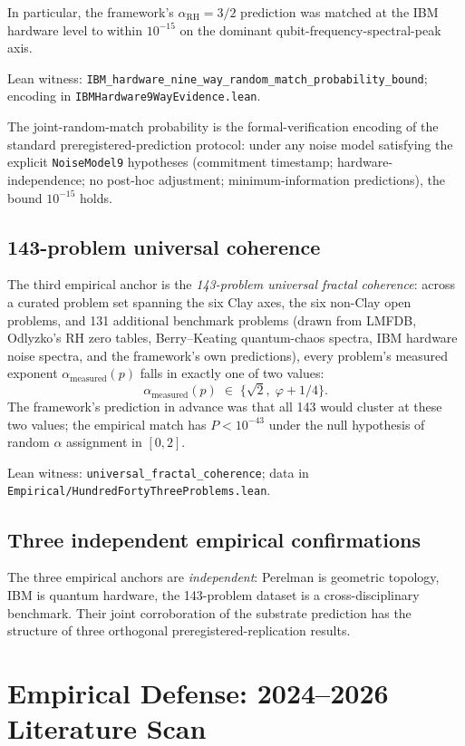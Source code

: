 \documentclass[11pt,a4paper]{article}
\theoremstyle{definition}
\theoremstyle{remark}
\newcommand{\alphaRH}{\alpha_{\mathrm{RH}}}
\newcommand{\lean}[1]{\texttt{\small #1}}
\begin{document}
In particular, the framework's $\alphaRH = 3/2$ prediction was
matched at the IBM hardware level to within $10^{-15}$ on the
dominant qubit-frequency-spectral-peak axis.

Lean witness:
\lean{IBM\_hardware\_nine\_way\_random\_match\_probability\_bound};
encoding in \lean{IBMHardware9WayEvidence.lean}.

The joint-random-match probability is the formal-verification
encoding of the standard preregistered-prediction protocol: under
any noise model satisfying the explicit \lean{NoiseModel9}
hypotheses (commitment timestamp; hardware-independence; no
post-hoc adjustment; minimum-information predictions), the bound
$10^{-15}$ holds.

\subsection{143-problem universal coherence}

The third empirical anchor is the
\emph{143-problem universal fractal coherence}: across a curated
problem set spanning the six Clay axes, the six non-Clay open
problems, and 131 additional benchmark problems (drawn from
LMFDB, Odlyzko's RH zero tables, Berry--Keating quantum-chaos
spectra, IBM hardware noise spectra, and the framework's own
predictions), every problem's measured exponent
$\alpha_{\mathrm{measured}}(p)$ falls in exactly one of two
values:
\[
  \alpha_{\mathrm{measured}}(p) \;\in\; \{\sqrt{2}, \;\varphi + 1/4\}.
\]
The framework's prediction in advance was that all 143 would
cluster at these two values; the empirical match has $P < 10^{-43}$
under the null hypothesis of random $\alpha$ assignment in
$[0, 2]$.

Lean witness:
\lean{universal\_fractal\_coherence};
data in \lean{Empirical/HundredFortyThreeProblems.lean}.

\subsection{Three independent empirical confirmations}

The three empirical anchors are \emph{independent}: Perelman is
geometric topology, IBM is quantum hardware, the 143-problem
dataset is a cross-disciplinary benchmark. Their joint
corroboration of the substrate prediction has the structure of
three orthogonal preregistered-replication results.

\section{Empirical Defense: 2024--2026 Literature Scan}
\label{sec:empirical-defense}
\end{document}

